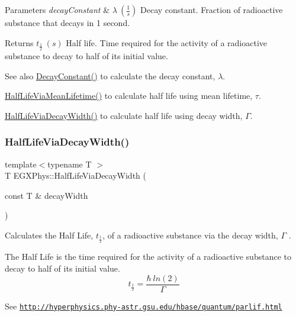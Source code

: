 \begin{DoxyParams}{Parameters}
{\em decay\+Constant} & $\lambda\ (\frac{1}{s})$ Decay constant. Fraction of radioactive substance that decays in 1 second. \\
\hline
\end{DoxyParams}
\begin{DoxyReturn}{Returns}
$t_{\frac{1}{2}}\ (s)$ Half life. Time required for the activity of a radioactive substance to decay to half of its initial value. 
\end{DoxyReturn}
\begin{DoxySeeAlso}{See also}
\mbox{\hyperlink{group___atomic_ga904edce5aad441b4a0873b3b1a83c7f2}{Decay\+Constant()}} to calculate the decay constant, $\lambda$. 

\mbox{\hyperlink{group___half_life_gacddef16b62e98b214ec8dd8af7da7dce}{Half\+Life\+Via\+Mean\+Lifetime()}} to calculate half life using mean lifetime, $\tau$. 

\mbox{\hyperlink{group___half_life_gaba3fda944d1a68ee1016a1f2f5809359}{Half\+Life\+Via\+Decay\+Width()}} to calculate half life using decay width, $\Gamma$. 
\end{DoxySeeAlso}
\mbox{\label{group___half_life_gaba3fda944d1a68ee1016a1f2f5809359}} 
\subsubsection{\texorpdfstring{Half\+Life\+Via\+Decay\+Width()}{HalfLifeViaDecayWidth()}}
{\footnotesize\ttfamily template$<$typename T $>$ \\
T E\+G\+X\+Phys\+::\+Half\+Life\+Via\+Decay\+Width (\begin{DoxyParamCaption}\item[{const T \&}]{decay\+Width }\end{DoxyParamCaption})}



Calculates the Half Life, $t_{\frac{1}{2}}$, of a radioactive substance via the decay width, $\Gamma$ . 

The Half Life is the time required for the activity of a radioactive substance to decay to half of its initial value. \[t_{\frac{1}{2}}=\frac{\hbar \ ln(2)}{\Gamma}\]

See \href{http://hyperphysics.phy-astr.gsu.edu/hbase/quantum/parlif.html}{\tt http\+://hyperphysics.\+phy-\/astr.\+gsu.\+edu/hbase/quantum/parlif.\+html}

